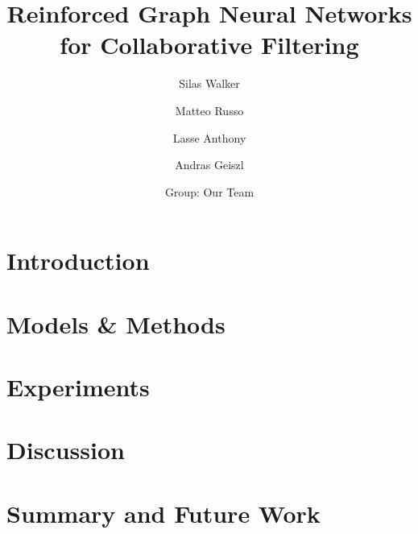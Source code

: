\documentclass[sigconf]{acmart}\settopmatter{printfolios=true,printccs=false,printacmref=false}
\begin{document}
\title{Reinforced Graph Neural Networks for Collaborative Filtering}

\author{Silas Walker}

\author{Matteo Russo}

\author{Lasse Anthony}

\author{Andras Geiszl}

\author{Group: Our Team}


\begin{abstract}

\end{abstract}

\maketitle

\section{Introduction}
\label{sec:introduction}


\section{Models \& Methods}
\label{sec:models_and_methods}


\section{Experiments}
\label{sec:results}


\section{Discussion}
\label{sec:discussion}


\section{Summary and Future Work}
\label{sec:summary}






\clearpage


\end{document}
